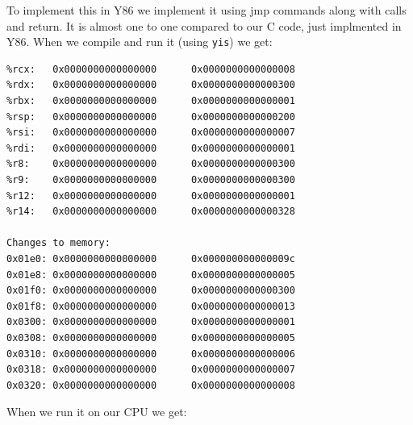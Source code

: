 \documentclass{article}
\begin{document}
To implement this in Y86 we implement it using jmp commands along with calls and return. It is almost one to one compared to our C code, just implmented in Y86. When we compile and run it (using \verb+yis+) we get:
\begin{verbatim}
%rcx:   0x0000000000000000      0x0000000000000008
%rdx:   0x0000000000000000      0x0000000000000300
%rbx:   0x0000000000000000      0x0000000000000001
%rsp:   0x0000000000000000      0x0000000000000200
%rsi:   0x0000000000000000      0x0000000000000007
%rdi:   0x0000000000000000      0x0000000000000001
%r8:    0x0000000000000000      0x0000000000000300
%r9:    0x0000000000000000      0x0000000000000300
%r12:   0x0000000000000000      0x0000000000000001
%r14:   0x0000000000000000      0x0000000000000328

Changes to memory:
0x01e0: 0x0000000000000000      0x000000000000009c
0x01e8: 0x0000000000000000      0x0000000000000005
0x01f0: 0x0000000000000000      0x0000000000000300
0x01f8: 0x0000000000000000      0x0000000000000013
0x0300: 0x0000000000000000      0x0000000000000001
0x0308: 0x0000000000000000      0x0000000000000005
0x0310: 0x0000000000000000      0x0000000000000006
0x0318: 0x0000000000000000      0x0000000000000007
0x0320: 0x0000000000000000      0x0000000000000008
\end{verbatim}
When we run it on our CPU we get:
\end{document}
